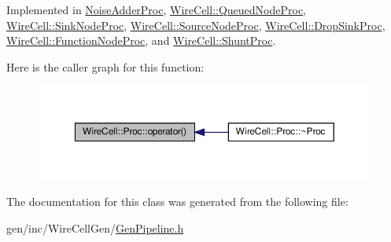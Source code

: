 Implemented in \hyperlink{class_noise_adder_proc_ace359f99c495a3cb4f4276c9e2b3ba4d}{Noise\+Adder\+Proc}, \hyperlink{class_wire_cell_1_1_queued_node_proc_a7ce2fbfadbf84f8031ef7315e7a6ee70}{Wire\+Cell\+::\+Queued\+Node\+Proc}, \hyperlink{class_wire_cell_1_1_sink_node_proc_a4bc788f3ec9f7558438f8b5f61a5ca1f}{Wire\+Cell\+::\+Sink\+Node\+Proc}, \hyperlink{class_wire_cell_1_1_source_node_proc_abd977752a7aa067206eea94ac69c940a}{Wire\+Cell\+::\+Source\+Node\+Proc}, \hyperlink{class_wire_cell_1_1_drop_sink_proc_a0bd6060109102714f2ee63aa340b9bcd}{Wire\+Cell\+::\+Drop\+Sink\+Proc}, \hyperlink{class_wire_cell_1_1_function_node_proc_a3b6d8a5d564ab458fe52b3c69fd284d1}{Wire\+Cell\+::\+Function\+Node\+Proc}, and \hyperlink{class_wire_cell_1_1_shunt_proc_a6fdf92dd0aa7ca22e8898b3a6802c923}{Wire\+Cell\+::\+Shunt\+Proc}.

Here is the caller graph for this function\+:
\nopagebreak
\begin{figure}[H]
\begin{center}
\leavevmode
\includegraphics[width=350pt]{class_wire_cell_1_1_proc_a9c642ed1f6b6741633c6cb1bd063b502_icgraph}
\end{center}
\end{figure}


The documentation for this class was generated from the following file\+:\begin{DoxyCompactItemize}
\item 
gen/inc/\+Wire\+Cell\+Gen/\hyperlink{_gen_pipeline_8h}{Gen\+Pipeline.\+h}\end{DoxyCompactItemize}
